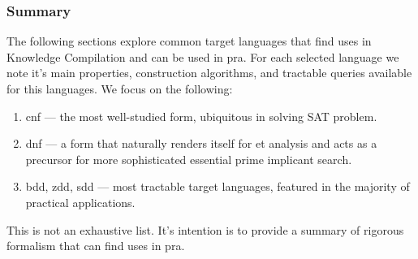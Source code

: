 \subsubsection{Summary}
The following sections explore common target languages that find uses in Knowledge Compilation and can be used in \acrshort{pra}. For each selected language we note it's main properties, construction algorithms, and tractable queries available for this languages. We focus on the following:
\begin{enumerate}
    \item \acrshort{cnf} --- the most well-studied form, ubiquitous in solving SAT problem.
    \item \acrshort{dnf} --- a form that naturally renders itself for \acrlong{et} analysis and acts as a precursor for more sophisticated essential prime implicant search.
    \item \acrshort{bdd}, \acrshort{zdd}, \acrshort{sdd} --- most tractable target languages, featured in the majority of practical applications.
\end{enumerate}
This is not an exhaustive list. It's intention is to provide a summary of rigorous formalism that can find uses in \acrfull{pra}.



